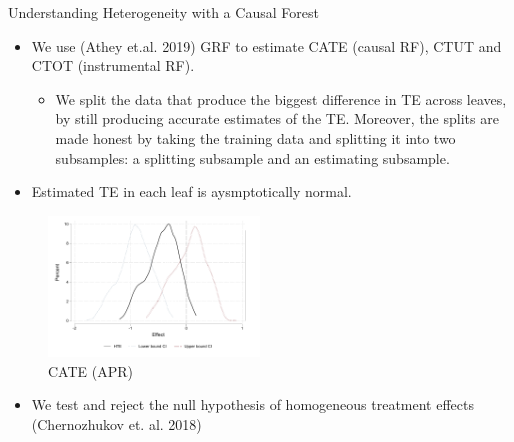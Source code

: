 \documentclass[8pt]{beamer}
\begin{document}
\begin{frame}{Understanding Heterogeneity with a Causal Forest}
\label{HTE}
\begin{itemize}

\item We use (Athey et.al. 2019) GRF to estimate CATE (causal RF), CTUT and CTOT (instrumental RF).

\begin{itemize}	
	\item We split the data that produce the biggest difference in TE across leaves, by still producing accurate estimates of the TE. Moreover, the splits are made honest by taking the training data and splitting it into two subsamples: a splitting subsample and an estimating subsample. \hyperlink{honest_causal_tree}{}   
\end{itemize}

\item Estimated TE in each leaf is aysmptotically normal. 
\end{itemize}


    \begin{figure}
        \caption{CATE (APR)}
        \centering
        \includegraphics[width=0.5\textwidth]{Figuras/he_dist_apr_pro_2.pdf}
        \end{figure}

 \begin{itemize}
\item We test and reject the null hypothesis of homogeneous treatment effects (Chernozhukov et. al. 2018)
 \end{itemize}       
\end{frame}
\end{document}
